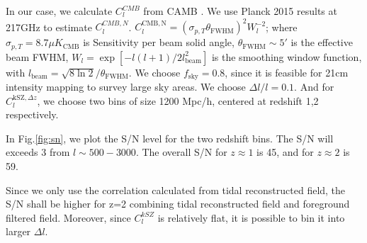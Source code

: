 In our case, we calculate $C_l^{CMB}$ from CAMB \cite{CAMB}. 
We use Planck 2015 results \cite{Planck2015} at 217GHz to estimate $C_l^{CMB,N}$.
$C_l^\mathrm{CMB,N}=(\sigma_{p,T}\theta_\mathrm{FWHM})^2W_l^{-2}$;  
where $\sigma_{p,T}=8.7\mu K_\mathrm{CMB}$ is Sensitivity per beam solid angle, 
$\theta_\mathrm{FWHM}\sim 5'$ is the effective beam FWHM, 
$W_l=\exp[-l(l+1)/2l^2_\mathrm{beam}]$ is the smoothing window function, 
with $l_\mathrm{beam}=\sqrt{8\ln2}/\theta_\mathrm{FWHM}$. 
We choose $f_\mathrm{sky}=0.8$, since it is feasible for 21cm intensity mapping to survey large sky areas. 
We choose $\Delta l/l=0.1$. 
And for $C_l^{\mathrm{kSZ},\Delta z}$, we choose two bins of size 1200 Mpc/h, centered at redshift 1,2 respectively.

In Fig.\ref{fig:sn}, we plot the S/N level for the two redshift bins. 
The S/N will exceeds 3 from $l\sim 500-3000$. 
The overall S/N for $z\approx1$ is 45, and for $z\approx2$ is 59. 

Since we only use the correlation calculated from tidal reconstructed field, the S/N shall be higher for z=2  
combining tidal reconstructed field and foreground filtered field. 
Moreover, since $C_l^{kSZ}$ is relatively flat, 
it is possible to bin it into larger $\Delta l$. 

